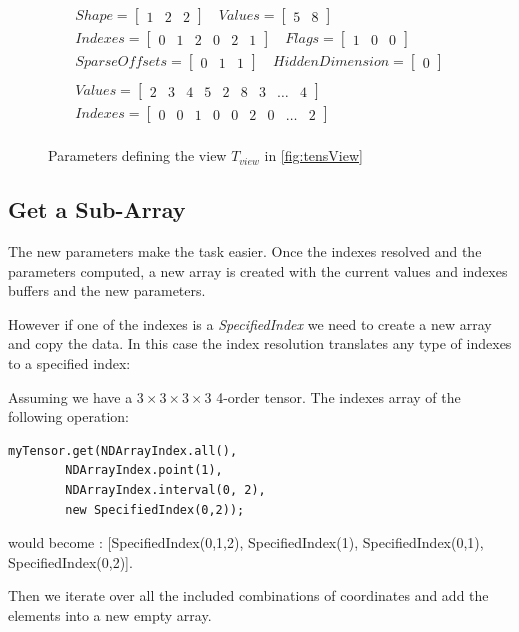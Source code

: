 \begin{figure}[!h]

		\[
		\begin{aligned}
		Shape = 
		\begin{bmatrix}
		1 & 2 & 2 
		\end{bmatrix}
		\quad
		Values = 
		\begin{bmatrix}
		5 & 8 
		\end{bmatrix}\\			
		Indexes = 
		\begin{bmatrix}
		0 &  1 & 2 & 0 & 2 & 1
		\end{bmatrix}		
		\quad	
		Flags = 
		\begin{bmatrix}
		1 & 0 & 0
		\end{bmatrix}\\			
		SparseOffsets = 
		\begin{bmatrix}
		0 &  1 & 1
		\end{bmatrix}
		\quad		
		HiddenDimension = 
		\begin{bmatrix}
		0 
		\end{bmatrix}\\	
		\quad	
		\quad	
		\\
		Values = 
		\begin{bmatrix}
		2 & 3 & 4 & 5 & 2 & 8 & 3 & \dots & 4
		\end{bmatrix}\\			
		Indexes = 
		\begin{bmatrix}
		0 & 0 & 1 & 0 & 0 & 2 & 0 & \dots & 2
		\end{bmatrix}\\			
		\end{aligned}
		\]
		\caption{Parameters defining the view $T_{view}$ in \ref{fig:tensView}}
		\label{eqn:viewParams}
\end{figure}

\subsection{Get a Sub-Array}

The new parameters make the task easier. Once the indexes resolved and the parameters computed, a new array is created with the current values and indexes buffers and the new parameters. 

However if one of the indexes is a \textit{SpecifiedIndex} we need to create a new array and copy the data. In this case the index resolution translates any type of indexes to a specified index:

Assuming we have a $3 \times 3 \times 3  \times 3$ 4-order tensor. The indexes array of the following operation:
\begin{lstlisting}[style=nonumbers]
	myTensor.get(NDArrayIndex.all(),
		NDArrayIndex.point(1),
		NDArrayIndex.interval(0, 2),
		new SpecifiedIndex(0,2));
\end{lstlisting}
  would become : [SpecifiedIndex(0,1,2), SpecifiedIndex(1), SpecifiedIndex(0,1), SpecifiedIndex(0,2)]. 

Then we iterate over all the included combinations of coordinates and add the elements into a new empty array.

